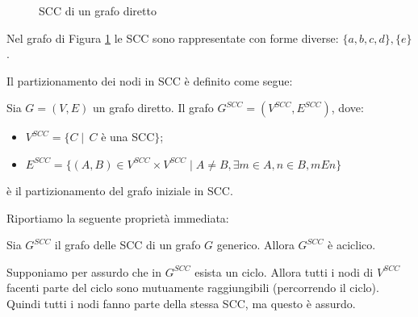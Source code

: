 \begin{example}
    \begin{figure}[t]
        \centering
        \caption{SCC di un grafo diretto}
        \label{fig:graph_cfc_1}
    \end{figure}
    Nel grafo di Figura \ref{fig:graph_cfc_1} le SCC sono rappresentate con forme diverse: $\{a,b,c,d\}, \{e\}$.
\end{example}
Il partizionamento dei nodi in SCC è definito come segue:
\begin{definition}
    Sia $G = (V, E)$ un grafo diretto. Il grafo $G^{SCC} = (V^{SCC}, E^{SCC})$, dove:
    \begin{itemize}
        \item $V^{SCC} = \{C \mid \,C$ è una SCC$\}$;
        \item $E^{SCC} = \{(A,B) \in V^{SCC} \times V^{SCC} \mid A \neq B, \exists m \in A, n \in B, m E n\}$
    \end{itemize}
    è il partizionamento del grafo iniziale in SCC.
\end{definition}
Riportiamo la seguente proprietà immediata:
\begin{proposition}
    Sia $G^{SCC}$ il grafo delle SCC di un grafo $G$ generico. Allora $G^{SCC}$ è aciclico.
\end{proposition}
\begin{proof2}
    Supponiamo per assurdo che in $G^{SCC}$ esista un ciclo. Allora tutti i nodi di $V^{SCC}$ facenti parte del ciclo sono mutuamente raggiungibili (percorrendo il ciclo). Quindi tutti i nodi fanno parte della stessa SCC, ma questo è assurdo.
\end{proof2}
